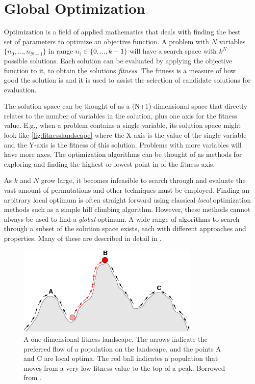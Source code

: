 \section{Global Optimization}

Optimization is a field of applied mathematics that deals with finding the best
set of parameters to optimize an objective function. A problem with $N$
variables $\{n_0, \dots, n_{N-1}\}$ in range $n_i \in \{0, \dots, k-1\}$ will
have a search space with $k^N$ possible solutions. Each solution can be
evaluated by applying the objective function to it, to obtain the solutions
\emph{fitness}. The fitness is a measure of how good the solution is and it is
used to assist the selection of candidate solutions for evaluation.

The solution space can be thought of as a (N+1)-dimensional space that directly
relates to the number of variables in the solution, plus one axis for the
fitness value. E.g., when a problem contains a single variable, its solution
space might look like \autoref{fig:fitnesslandscape} where the X-axis is the
value of the single variable and the Y-axis is the fitness of this solution.
Problems with more variables will have more axes. The optimization algorithms
can be thought of as methods for exploring and finding the highest or lowest
point in of the fitness-axis.

As $k$ and $N$ grow large, it becomes infeasible to search through and
evaluate the vast amount of permutations and other techniques must be employed.
Finding an arbitrary local optimum is often straight forward using classical
\emph{local} optimization methods such as a simple hill climbing algorithm.
However, these methods cannot always be used to find a \emph{global} optimum. A wide
range of algorithms to search through a subset of the solution space exists,
each with different approaches and properties. Many of these are described in
detail in \cite{russellnorvig}.

\begin{figure}[bth]
    \centering
    \includegraphics[width=0.8\textwidth]{figs/Fitness-landscape-cartoon.png}
    \caption{A one-dimensional fitness landscape. The arrows indicate the
        preferred flow of a population on the landscape, and the points A and C
        are local optima. The red ball indicates a population that moves from a
        very low fitness value to the top of a peak. Borrowed from \cite{wikifitnesslandscape}.}
    \label{fig:fitnesslandscape}
\end{figure}

